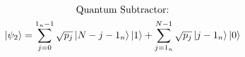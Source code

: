 \documentclass[border=0pt,varwidth]{standalone}
\begin{document}
\vspace*{1em}
\begin{gather*}
\text{Quantum Subtractor:} \\
\ket{\psi_2}=\sum^{1_n-1}_{j=0}\sqrt{p_j}\ket{N-j-1_n}\ket{1}+\sum^{N-1}_{j=1_n}\sqrt{p_j}\ket{j-1_n}\ket{0}
\end{gather*}
\vspace*{1em}
\end{document}
